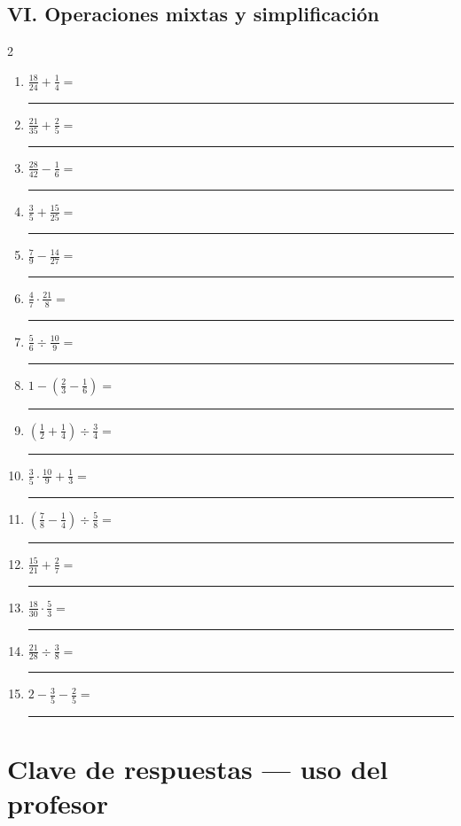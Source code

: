 \documentclass[11pt]{article}
\begin{document}
\subsection*{VI. Operaciones mixtas y simplificación}
\begin{multicols}{2}\begin{enumerate}[leftmargin=*,start=86]
\item $\displaystyle \frac{18}{24}+\frac14=$ \rule{2.0cm}{0.4pt}
\item $\displaystyle \frac{21}{35}+\frac25=$ \rule{2.0cm}{0.4pt}
\item $\displaystyle \frac{28}{42}-\frac16=$ \rule{2.0cm}{0.4pt}
\item $\displaystyle \frac35+\frac{15}{25}=$ \rule{2.0cm}{0.4pt}
\item $\displaystyle \frac79-\frac{14}{27}=$ \rule{2.0cm}{0.4pt}
\item $\displaystyle \frac47\cdot\frac{21}{8}=$ \rule{2.0cm}{0.4pt}
\item $\displaystyle \frac56\div\frac{10}{9}=$ \rule{2.0cm}{0.4pt}
\item $\displaystyle 1-\left(\frac23-\frac16\right)=$ \rule{2.0cm}{0.4pt}
\item $\displaystyle \left(\frac12+\frac14\right)\div\frac34=$ \rule{2.0cm}{0.4pt}
\item $\displaystyle \frac35\cdot\frac{10}{9}+\frac13=$ \rule{2.0cm}{0.4pt}
\item $\displaystyle \left(\frac78-\frac14\right)\div\frac58=$ \rule{2.0cm}{0.4pt}
\item $\displaystyle \frac{15}{21}+\frac27=$ \rule{2.0cm}{0.4pt}
\item $\displaystyle \frac{18}{30}\cdot\frac53=$ \rule{2.0cm}{0.4pt}
\item $\displaystyle \frac{21}{28}\div\frac38=$ \rule{2.0cm}{0.4pt}
\item $\displaystyle 2-\frac35-\frac25=$ \rule{2.0cm}{0.4pt}
\end{enumerate}\end{multicols}

\newpage
\section*{Clave de respuestas --- uso del profesor}
\end{document}
